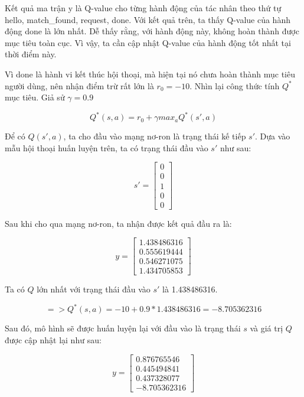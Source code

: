 Kết quả ma trận y là Q-value cho từng hành động của tác nhân theo
thứ tự hello, match\_found, request, done. Với kết quả trên, ta
thấy Q-value của hành động done là lớn nhất. Dễ thấy rằng, với
hành động này, không hoàn thành được mục tiêu toàn cục. Vì vậy, ta
cần cập nhật Q-value của hành động tốt nhất tại thời điểm này.

Vì done là hành vi kết thúc hội thoại, mà hiện tại nó chưa hoàn thành
mục tiêu người dùng, nên nhận điểm trừ rất lớn là $r_0 = -10$.
Nhìn lại công thức tính $Q^*$ mục tiêu. Giả sử $\gamma = 0.9$

\begin{equation*}
    Q^*(s,a) = r_0 + {\gamma}max_{a}Q^{*}(s',a)
\end{equation*}

Để có $Q(s',a)$, ta cho đầu vào mạng nơ-ron là trạng thái kế tiếp
$s'$. Dựa vào mẫu hội thoại huấn luyện trên, ta có trạng thái
đầu vào $s'$ như sau:

\begin{equation*}
    s' =
    \begin{bmatrix}
        0 \\
        0 \\
        1 \\
        0 \\
        0
    \end{bmatrix}
\end{equation*}

Sau khi cho qua mạng nơ-ron, ta nhận được kết quả đầu ra là:

\begin{equation*}
    y =
    \begin{bmatrix}
        1.438486316 \\
        0.555619444 \\
        0.546271075 \\
        1.434705853
    \end{bmatrix}
\end{equation*}

Ta có $Q$ lớn nhất với trạng thái đầu vào $s'$ là 1.438486316.

\begin{equation*}
    => Q^*(s,a) = -10 + 0.9*1.438486316 = -8.705362316
\end{equation*}

Sau đó, mô hình sẽ được huấn luyện lại với đầu vào là trạng thái $s$
và giá trị $Q$ được cập nhật lại như sau:

\begin{equation*}
    y =
    \begin{bmatrix}
        0.876765546 \\
        0.445494841 \\
        0.437328077 \\
        -8.705362316
    \end{bmatrix}
\end{equation*}
